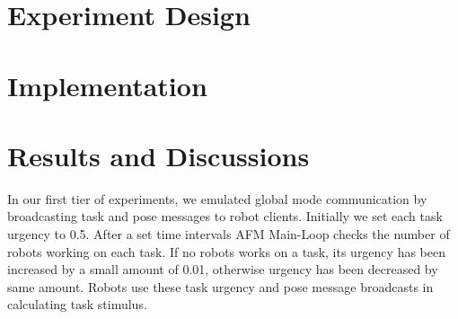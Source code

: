\documentclass{llncs}
\begin{document}
\section{Experiment Design}
\label{sec:expt-design}

\section{Implementation}
\label{sec:impl}

\section{Results and Discussions}
\label{sec:results}
In our first tier of experiments, we emulated global mode communication by broadcasting task and pose messages to robot clients. Initially we set each task urgency to 0.5. After a set time intervals AFM Main-Loop checks the number of robots working on each task. If no robots works on a task, its urgency has been increased by a small amount of 0.01, otherwise urgency has been decreased by same amount. Robots use these task urgency and pose message broadcasts in calculating task stimulus.
\end{document}

